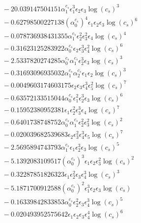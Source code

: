 \documentclass[10pt]{article}
\begin{document}
\begin{align*}
&{}  - 20.039147504151 \alpha_{1}^{c_s} \epsilon_{1}^{3} \epsilon_{2} \epsilon_{3} \log{\left(c_{s} \right)}^{3} \\
&{}  - 0.62798500227138 \left(\alpha_{0}^{c_s}\right)^{4} \epsilon_{1} \epsilon_{2} \epsilon_{3} \log{\left(c_{s} \right)}^{6} \\
&{}  - 0.078736938431355 \alpha_{1}^{c_s} \epsilon_{2}^{2} \epsilon_{3}^{2} \epsilon_{4} \log{\left(c_{s} \right)}^{4} \\
&{}  - 0.31623125283922 \alpha_{0}^{c_s} \epsilon_{2} \epsilon_{3}^{3} \epsilon_{4}^{2} \log{\left(c_{s} \right)}^{6} \\
&{}  - 2.5337820274285 \alpha_{0}^{c_s} \alpha_{1}^{c_s} \epsilon_{2}^{3} \epsilon_{3} \log{\left(c_{s} \right)}^{3} \\
&{}  - 0.31693096935032 \alpha_{1}^{c_s} \alpha_{2}^{c_s} \epsilon_{1} \epsilon_{2} \log{\left(c_{s} \right)}^{3} \\
&{}  - 0.0049603174603175 \epsilon_{2} \epsilon_{3} \epsilon_{4}^{3} \epsilon_{5}^{2} \log{\left(c_{s} \right)}^{7} \\
&{}  - 0.63572133515044 \alpha_{0}^{c_s} \epsilon_{1}^{2} \epsilon_{2}^{3} \epsilon_{3} \log{\left(c_{s} \right)}^{6} \\
&{}  - 0.15952380952381 \epsilon_{1} \epsilon_{2}^{2} \epsilon_{3}^{3} \epsilon_{4} \log{\left(c_{s} \right)}^{7} \\
&{}  - 0.6401738748752 \alpha_{0}^{c_s} \alpha_{1}^{c_s} \epsilon_{2}^{2} \epsilon_{3}^{2} \log{\left(c_{s} \right)}^{2} \\
&{}  - 0.020039682539683 \epsilon_{2} \epsilon_{3}^{2} \epsilon_{4}^{3} \epsilon_{5} \log{\left(c_{s} \right)}^{7} \\
&{}  - 2.5695894743793 \alpha_{1}^{c_s} \epsilon_{1} \epsilon_{2}^{3} \epsilon_{3} \log{\left(c_{s} \right)}^{5} \\
&{}  - 5.1392083109517 \left(\alpha_{0}^{c_s}\right)^{3} \epsilon_{1} \epsilon_{2} \epsilon_{3}^{2} \log{\left(c_{s} \right)}^{2} \\
&{}  - 0.32287851826323 \epsilon_{1} \epsilon_{2}^{2} \epsilon_{3} \epsilon_{4}^{3} \log{\left(c_{s} \right)}^{3} \\
&{}  - 5.1871700912588 \left(\alpha_{0}^{c_s}\right)^{2} \epsilon_{1}^{3} \epsilon_{2} \epsilon_{3} \log{\left(c_{s} \right)} \\
&{}  - 0.16339842833853 \alpha_{0}^{c_s} \epsilon_{2}^{2} \epsilon_{3} \epsilon_{4}^{3} \log{\left(c_{s} \right)}^{5} \\
&{}  - 0.020493952575642 \epsilon_{1} \epsilon_{2} \epsilon_{3} \epsilon_{4}^{4} \log{\left(c_{s} \right)}^{6} \\

\end{align*}
\end{document}
